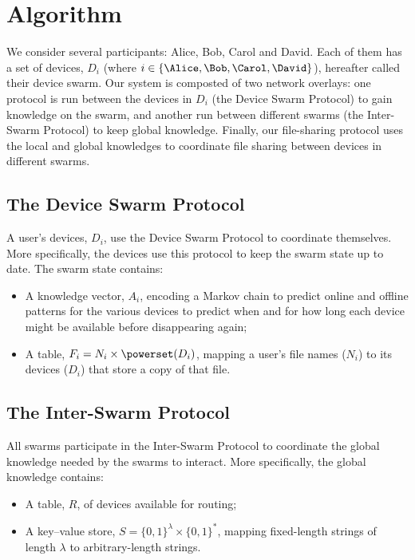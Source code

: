 \section{Algorithm}%
\label{Algorithm}


We consider several participants: Alice, Bob, Carol and David.
Each of them has a set of devices, \(D_i\) (where \(i\in \{\Alice, \Bob, \Carol, 
  \David\}\)), hereafter called their device swarm.
Our system is composted of two network overlays: one protocol is run between the 
devices in \(D_i\) (the Device Swarm Protocol) to gain knowledge on the 
swarm, and another run between different swarms (the Inter-Swarm Protocol) to 
keep global knowledge.
Finally, our file-sharing protocol uses the local and global 
knowledges to coordinate file sharing between devices in different swarms.

\subsection{The Device Swarm Protocol}%
\label{DeviceSwarmProtocol}

A user's devices, \(D_i\), use the Device Swarm Protocol to coordinate 
themselves.
More specifically, the devices use this protocol to keep the swarm state up to 
date.
The swarm state contains:
\begin{itemize}
  \item A knowledge vector, \(A_i\), encoding a Markov chain to predict online 
    and offline patterns for the various devices to predict when and for how 
    long each device might be available before disappearing again;
  \item A table, \(F_i = N_i\times \powerset(D_i)\), mapping a user's file names 
    (\(N_i\)) to its devices (\(D_i\)) that store a copy of that file.
\end{itemize}


\subsection{The Inter-Swarm Protocol}%
\label{InterSwarmProtocol}

All swarms participate in the Inter-Swarm Protocol to coordinate the global 
knowledge needed by the swarms to interact.
More specifically, the global knowledge contains:
\begin{itemize}
  \item A table, \(R\), of devices available for routing;
  \item A key--value store, \(S = \{0, 1\}^\lambda\times \{0, 1\}^*\), mapping 
    fixed-length strings of length \(\lambda\) to arbitrary-length strings.
\end{itemize}

